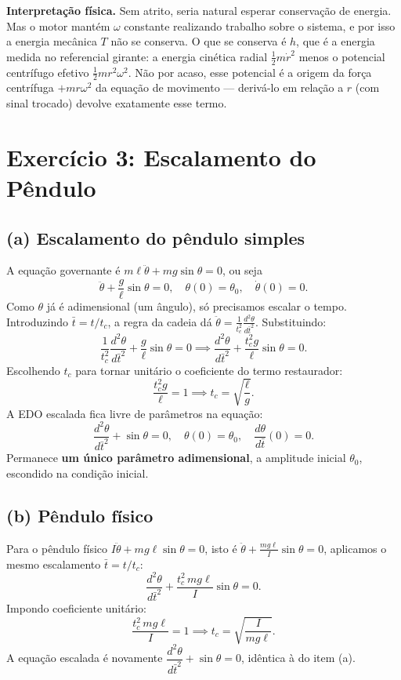 \documentclass{article}
\begin{document}
\textbf{Interpretação física.} Sem atrito, seria natural esperar conservação de
energia. Mas o motor mantém $\omega$ constante realizando trabalho sobre o sistema, e
por isso a energia mecânica $T$ não se conserva. O que se conserva é $h$, que é a
energia medida no referencial girante: a energia cinética radial $\tfrac{1}{2}m\dot r^2$
menos o potencial centrífugo efetivo $\tfrac{1}{2}m r^2\omega^2$. Não por acaso, esse
potencial é a origem da força centrífuga $+mr\omega^2$ da equação de movimento —
derivá-lo em relação a $r$ (com sinal trocado) devolve exatamente esse termo.






\section*{Exercício 3: Escalamento do Pêndulo}

\subsection*{(a) Escalamento do pêndulo simples}
A equação governante é $m\ell\ddot{\theta} + mg\sin\theta = 0$, ou seja
\[ \ddot{\theta} + \frac{g}{\ell}\sin\theta = 0, \quad \theta(0) = \theta_0, \quad \dot{\theta}(0) = 0. \]
Como $\theta$ já é adimensional (um ângulo), só precisamos escalar o tempo. Introduzindo $\bar{t} = t/t_c$, a regra da cadeia dá $\ddot{\theta} = \frac{1}{t_c^2}\frac{d^2\theta}{d\bar{t}^2}$. Substituindo:
\[ \frac{1}{t_c^2}\frac{d^2\theta}{d\bar{t}^2} + \frac{g}{\ell}\sin\theta = 0 \implies \frac{d^2\theta}{d\bar{t}^2} + \frac{t_c^2 g}{\ell}\sin\theta = 0. \]
Escolhendo $t_c$ para tornar unitário o coeficiente do termo restaurador:
\[ \frac{t_c^2 g}{\ell} = 1 \implies t_c = \sqrt{\frac{\ell}{g}}. \]
A EDO escalada fica livre de parâmetros na equação:
\[ \frac{d^2\theta}{d\bar{t}^2} + \sin\theta = 0, \quad \theta(0) = \theta_0, \quad \frac{d\theta}{d\bar{t}}(0) = 0. \]
Permanece \textbf{um único parâmetro adimensional}, a amplitude inicial $\theta_0$, escondido na condição inicial.

\subsection*{(b) Pêndulo físico}
Para o pêndulo físico $I\ddot{\theta} + mg\ell\sin\theta = 0$, isto é $\ddot{\theta} + \frac{mg\ell}{I}\sin\theta = 0$, aplicamos o mesmo escalamento $\bar{t} = t/t_c$:
\[ \frac{d^2\theta}{d\bar{t}^2} + \frac{t_c^2\, mg\ell}{I}\sin\theta = 0. \]
Impondo coeficiente unitário:
\[ \frac{t_c^2\, mg\ell}{I} = 1 \implies t_c = \sqrt{\frac{I}{mg\ell}}. \]
A equação escalada é novamente $\dfrac{d^2\theta}{d\bar{t}^2} + \sin\theta = 0$, idêntica à do item (a).
\end{document}
